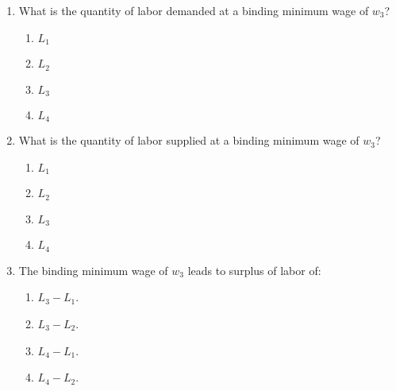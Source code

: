 \documentclass[
    letterpaper,paper=portrait,fleqn,
    DIV=16,fontsize=12pt,twoside=semi,
    parskip=full-,
    headings=standardclasses]
{scrartcl}
\begin{document}
\begin{enumerate}[resume]

\item What is the quantity of labor demanded at a binding minimum wage of $w_3$?
\vspace{-8pt}
\begin{multicols}{2}
\begin{enumerate}
\item $L_1$
\item $L_2$
\item $L_3$
\item $L_4$
\end{enumerate}
\end{multicols}

\item What is the quantity of labor supplied at a binding minimum wage of $w_3$?
\vspace{-8pt}
\begin{multicols}{2}
\begin{enumerate}
\item $L_1$
\item $L_2$
\item $L_3$
\item $L_4$
\end{enumerate}
\end{multicols}

\item The binding minimum wage of $w_3$ leads to surplus of labor of:
\vspace{-8pt}
\begin{multicols}{2}
\begin{enumerate}
\item $L_3 - L_1$.
\item $L_3 - L_2$.
\item $L_4 - L_1$.
\item $L_4 - L_2$.
\end{enumerate}
\end{multicols}

\end{enumerate}
\end{document}
